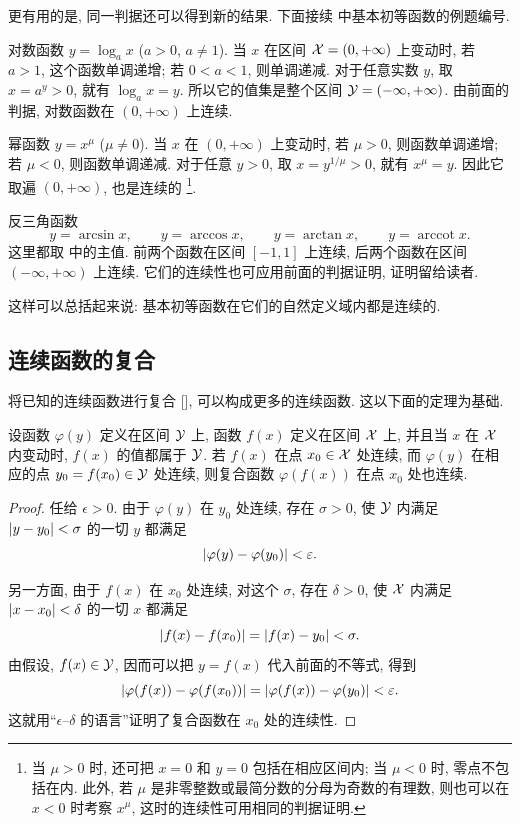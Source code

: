 更有用的是, 同一判据还可以得到新的结果.
下面接续  中基本初等函数的例题编号.

\myrefparagraph{5\textdegree}\label{ex:logarithm_continuity}
对数函数 $y=\log_a x$ ($a>0$, $a\neq1$).
当 $x$ 在区间 $\mathcal{X}=(0,+\infty)$ 上变动时,
若 $a>1$, 这个函数单调递增; 若 $0<a<1$, 则单调递减.
对于任意实数 $y$, 取 $x=a^y>0$, 就有 $\log_a x=y$.
所以它的值集是整个区间 $\mathcal{Y}=(-\infty,+\infty)$.
由前面的判据, 对数函数在 $(0,+\infty)$ 上连续.

\myrefparagraph{6\textdegree}\label{ex:real_power_continuity}
幂函数 $y=x^\mu$ ($\mu\neq0$).
当 $x$ 在 $(0,+\infty)$ 上变动时,
若 $\mu>0$, 则函数单调递增; 若 $\mu<0$, 则函数单调递减.
对于任意 $y>0$, 取 $x=y^{1/\mu}>0$, 就有 $x^\mu=y$.
因此它取遍 $(0,+\infty)$, 也是连续的
\footnote{当 $\mu>0$ 时, 还可把 $x=0$ 和 $y=0$ 包括在相应区间内;
当 $\mu<0$ 时, 零点不包括在内.
此外, 若 $\mu$ 是非零整数或最简分数的分母为奇数的有理数,
则也可以在 $x<0$ 时考察 $x^\mu$, 这时的连续性可用相同的判据证明.}.

\myrefparagraph{7\textdegree}\label{ex:inverse_trigonometric_continuity}
反三角函数
$$
y=\arcsin x,\qquad y=\arccos x,\qquad
y=\arctan x,\qquad y=\operatorname{arccot}x.
$$
这里都取  中的主值.
前两个函数在区间 $[-1,1]$ 上连续, 后两个函数在区间
$(-\infty,+\infty)$ 上连续.
它们的连续性也可应用前面的判据证明, 证明留给读者.

这样可以总括起来说:
{\kaishu 基本初等函数在它们的自然定义域内都是连续的.}

\subsection{连续函数的复合}\label{subsec:73}
将已知的连续函数进行复合 [], 可以构成更多的连续函数.
这以下面的定理为基础.

\begin{theorem}\label{thm:continuity_composition}
设函数 $\varphi(y)$ 定义在区间 $\mathcal{Y}$ 上, 函数 $f(x)$ 定义在区间 $\mathcal{X}$ 上,
并且当 $x$ 在 $\mathcal{X}$ 内变动时, $f(x)$ 的值都属于 $\mathcal{Y}$.
若 $f(x)$ 在点 $x_0\in\mathcal{X}$ 处连续,
而 $\varphi(y)$ 在相应的点 $y_0=f(x_0)\in\mathcal{Y}$ 处连续,
则复合函数 $\varphi(f(x))$ 在点 $x_0$ 处也连续.
\end{theorem}

\begin{proof}
任给 $\epsilon>0$. 由于 $\varphi(y)$ 在 $y_0$ 处连续,
存在 $\sigma>0$, 使 $\mathcal{Y}$ 内满足 $\left| y-y_0 \right|<\sigma$ 的一切 $y$ 都满足
$$
\left| \varphi(y)-\varphi(y_0) \right|<\varepsilon.
$$

另一方面, 由于 $f(x)$ 在 $x_0$ 处连续, 对这个 $\sigma$,
存在 $\delta>0$, 使 $\mathcal{X}$ 内满足 $\left| x-x_0 \right|<\delta$ 的一切 $x$ 都满足
$$
\left| f(x)-f(x_0) \right|=\left| f(x)-y_0 \right|<\sigma.
$$
由假设, $f(x)\in\mathcal{Y}$, 因而可以把 $y=f(x)$ 代入前面的不等式, 得到
$$
\left| \varphi(f(x))-\varphi(f(x_0)) \right|
=\left| \varphi(f(x))-\varphi(y_0) \right|<\varepsilon.
$$
这就用“$\epsilon$--$\delta$ 的语言”证明了复合函数在 $x_0$ 处的连续性.
\end{proof}

